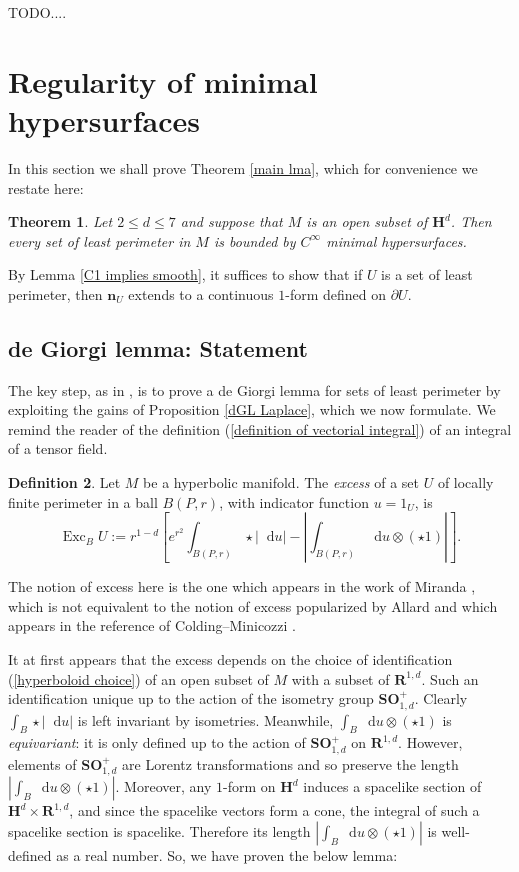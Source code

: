 \documentclass[reqno,12pt,letterpaper]{amsart}
\newcommand{\RR}{\mathbf{R}}
\newcommand{\Hyp}{\mathbf H}
\newcommand{\SpOrth}{\mathbf{SO}}
\DeclareMathOperator{\Exc}{Exc}
\newcommand*\dif{\mathop{}\!\mathrm{d}}
\newcommand{\normal}{\mathbf n}
\newcommand{\dfn}[1]{\emph{#1}\index{#1}}
\newtheorem{theorem}{Theorem}[section]
\theoremstyle{definition}
\newtheorem{definition}[theorem]{Definition}
\numberwithin{equation}{section}
\begin{document}
TODO....

\section{Regularity of minimal hypersurfaces}\label{de Giorgi section}
In this section we shall prove Theorem \ref{main lma}, which for convenience we restate here:

\begin{theorem}
Let $2 \leq d \leq 7$ and suppose that $M$ is an open subset of $\Hyp^d$.
Then every set of least perimeter in $M$ is bounded by $C^\infty$ minimal hypersurfaces.
\end{theorem}

By Lemma \ref{C1 implies smooth}, it suffices to show that if $U$ is a set of least perimeter, then $\normal_U$ extends to a continuous $1$-form defined on $\partial U$.


\subsection{de Giorgi lemma: Statement}
The key step, as in \cite{Miranda66}, is to prove a de Giorgi lemma for sets of least perimeter by exploiting the gains of Proposition \ref{dGL Laplace}, which we now formulate.
We remind the reader of the definition (\ref{definition of vectorial integral}) of an integral of a tensor field.

\begin{definition}
Let $M$ be a hyperbolic manifold.
The \dfn{excess} of a set $U$ of locally finite perimeter in a ball $B(P, r)$, with indicator function $u = 1_U$, is
$$\Exc_B U := r^{1 - d}\left[e^{r^2}\int_{B(P, r)} \star |\dif u| - \left|\int_{B(P, r)} \dif u \otimes (\star 1)\right|\right].$$
\end{definition}

The notion of excess here is the one which appears in the work of Miranda \cite{Miranda66}, which is not equivalent to the notion of excess popularized by Allard \cite{Allard72} and which appears in the reference of Colding--Minicozzi \cite{colding2011course}.

It at first appears that the excess depends on the choice of identification (\ref{hyperboloid choice}) of an open subset of $M$ with a subset of $\RR^{1, d}$.
Such an identification unique up to the action of the isometry group $\SpOrth_{1, d}^+$.
Clearly $\int_B \star |\dif u|$ is left invariant by isometries.
Meanwhile, $\int_B \dif u \otimes (\star 1)$ is \emph{equivariant}: it is only defined up to the action of $\SpOrth_{1, d}^+$ on $\RR^{1, d}$.
However, elements of $\SpOrth_{1, d}^+$ are Lorentz transformations and so preserve the length $|\int_B \dif u \otimes (\star 1)|$.
Moreover, any $1$-form on $\Hyp^d$ induces a spacelike section of $\Hyp^d \times \RR^{1, d}$, and since the spacelike vectors form a cone, the integral of such a spacelike section is spacelike.
Therefore its length $|\int_B \dif u \otimes (\star 1)|$ is well-defined as a real number.
So, we have proven the below lemma:
\end{document}
